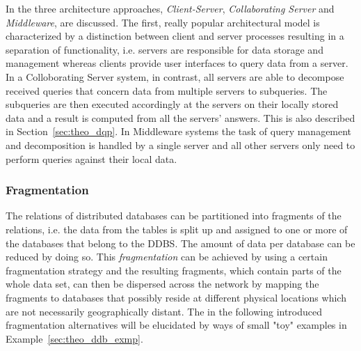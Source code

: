 In \citet[p.~608f.]{Ramakrish2000} the three architecture approaches, \emph{Client-Server}, \emph{Collaborating Server} and \emph{Middleware}, are 
discussed. The first, really popular architectural model is characterized by a distinction between client and server processes resulting in a separation of
functionality, i.e. servers are responsible for data storage and management whereas clients provide user interfaces to query data from a server. In a
Colloborating Server system, in contrast, all servers are able to decompose received queries that concern data from multiple servers to subqueries. The
subqueries are then executed accordingly at the servers on their locally stored data and a result is computed from all the servers' answers. This is also
described in Section~\ref{sec:theo_dqp}.
In Middleware systems the task of query management and decomposition is handled by a single server and all other servers only need to perform queries against
their local data.



\subsubsection{Fragmentation}
\label{sec:theo_ddb_frag}
The relations of distributed databases can be partitioned into fragments of the relations, i.e. the data from the tables is split up and assigned to one or 
more of the databases that belong to the DDBS. The amount of data per database can be reduced by doing so. This \emph{fragmentation} can be achieved by using
a certain fragmentation strategy and the resulting fragments, which contain parts of the whole data set, can then be dispersed across the network by mapping
the fragments to databases that possibly reside at different physical locations which are not necessarily geographically distant. The in the following 
introduced fragmentation alternatives will be elucidated by ways of small "toy" examples in Example~\ref{sec:theo_ddb_exmp}.

